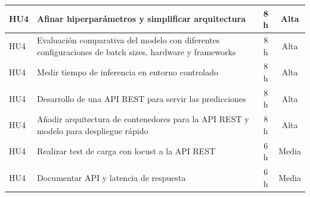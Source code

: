 \documentclass[
11pt, %
]{charter}
\begin{document}
\begin{table}[htpb]
\begin{tabularx}{\linewidth}{@{}|X|X|c|c|@{}}
HU4 & Afinar hiperparámetros y simplificar arquitectura					 & 8 h & Alta \\ \hline
HU4 & Evaluación comparativa del modelo con diferentes configuraciones de batch sizes, hardware y frameworks				 & 8 h & Alta \\ \hline
HU4 & Medir tiempo de inferencia en entorno controlado					 & 8 h & Alta \\ \hline
HU4 & Desarrollo de una API REST para servir las predicciones 					 & 8 h & Alta \\ \hline
HU4 & Añadir arquitectura de contenedores para la API REST y modelo para despliegue rápido	 					 & 8 h & Alta \\ \hline
HU4 & Realizar test de carga con locust a la API REST  					 & 6 h & Media \\ \hline
HU4 & Documentar API y latencia de respuesta	  					 & 6 h & Media \\ \hline



\end{tabularx}
\end{table}
\end{document}

